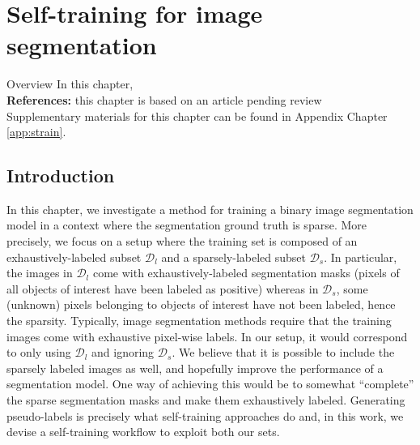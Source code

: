 \chapter{Self-training for image segmentation}
\label{chap:strain}

\begin{overview}{Overview}
  In this chapter, \\
  
  \textbf{References:} this chapter is based on an article pending review \\
  
  Supplementary materials for this chapter can be found in Appendix Chapter \ref{app:strain}.
  \end{overview}

\section{Introduction}
\label{sec:strain:intro}

In this chapter, we investigate a method for training a binary image segmentation model in a context where the segmentation ground truth is sparse. More precisely, we focus on a setup where the training set is composed of an exhaustively-labeled subset $\mathcal{D}_l$ and a sparsely-labeled subset $\mathcal{D}_s$. In particular, the images in $\mathcal{D}_l$ come with exhaustively-labeled segmentation masks (\ie pixels of all objects of interest have been labeled as positive) whereas in $\mathcal{D}_s$, some (unknown) pixels belonging to objects of interest have not been labeled, hence the sparsity. Typically, image segmentation methods require that the training images come with exhaustive pixel-wise labels. In our setup, it would correspond to only using $\mathcal{D}_l$ and ignoring $\mathcal{D}_s$. We believe that it is possible to include the sparsely labeled images as well, and hopefully improve the performance of a segmentation model. One way of achieving this would be to somewhat ``complete'' the sparse segmentation masks and make them exhaustively labeled. Generating pseudo-labels is precisely what self-training approaches do and, in this work, we devise a self-training workflow to exploit both our sets.

